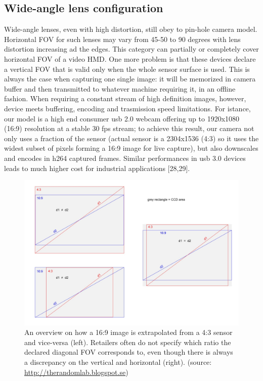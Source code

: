 \subsection{Wide-angle lens configuration}
Wide-angle lenses, even with high distortion, still obey to pin-hole camera model. Horizontal FOV for such lenses may vary from 45-50 to 90 degrees with lens distortion increasing ad the edges. This category can partially or completely cover horizontal FOV of a video HMD. One more problem is that these devices declare a vertical FOV that is valid only when the whole sensor surface is used. This is always the case when capturing one single image: it will be memorized in camera buffer and then transmitted to whatever machine requiring it, in an offline fashion. When requiring a constant stream of high definition images, however, device meets buffering, encoding and trasmission speed limitations. For istance, our model is a high end consumer usb 2.0 webcam offering up to 1920x1080 (16:9) resolution at a stable 30 fps stream; to achieve this result, our camera not only uses a fraction of the sensor (actual sensor is a 2304x1536 (4:3) so it uses the widest subset of pixels forming a 16:9 image for live capture), but also downscales and encodes in h264 captured frames. Similar performances in usb 3.0 devices leads to much higher cost for industrial applications [28,29].

\begin{figure}
\centering
\includegraphics[width=\linewidth]{schemas/diagonal_FOV}
\caption{An overview on how a 16:9 image is extrapolated from a 4:3 sensor and vice-versa (left). Retailers often do not specify which ratio the declared diagonal FOV corresponds to, even though there is always a discrepancy on the vertical and horizontal (right). (source: \href{http://therandomlab.blogspot.se/2013/03/logitech-c920-and-c910-fields-of-view.html}{http://therandomlab.blogspot.se})}
\label{fig:timewarp_timeline}
\end{figure}

